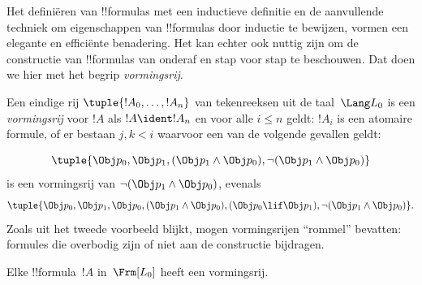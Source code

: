 \documentclass[../../../include/open-logic-section]{subfiles}
\begin{document}


Het definiëren van !!{formula}s met een inductieve definitie en de
aanvullende techniek om eigenschappen van !!{formula}s door inductie te
bewijzen, vormen een elegante en efficiënte benadering. Het kan echter
ook nuttig zijn om de constructie van !!{formula}s van onderaf en stap
voor stap te beschouwen. Dat doen we hier met het begrip
\emph{vormingsrij}.

\begin{defn}
Een eindige rij $\tuple{!A_0,\dotsc,!A_n}$ van tekenreeksen uit de
taal~$\Lang L_0$ is een \emph{vormingsrij} voor $!A$ als
$!A \ident !A_n$ en voor alle $i \leq n$ geldt: $!A_i$ is een
atomaire formule, of er bestaan $j,k < i$ waarvoor een van de volgende
gevallen geldt:
\begin{enumerate}
\end{enumerate}
\end{defn}

\begin{ex}
\[
\tuple{
    \Obj p_0,
    \Obj p_1,
    (\Obj p_1 \land \Obj p_0),
    \lnot (\Obj p_1 \land \Obj p_0)
}
\]
is een vormingsrij van
$\lnot (\Obj p_1 \land \Obj p_0)$, evenals
\[
\tuple{
    \Obj p_0,
    \Obj p_1,
    \Obj p_0,
    (\Obj p_1 \land \Obj p_0),
    (\Obj p_0 \lif \Obj p_1),
    \lnot (\Obj p_1 \land \Obj p_0)
}.
\]
%
Zoals uit het tweede voorbeeld blijkt, mogen vormingsrijen ``rommel''
bevatten: formules die overbodig zijn of niet aan de constructie
bijdragen.
\end{ex}

\begin{prop}
Elke !!{formula}~$!A$ in~$\Frm[L_0]$ heeft een vormingsrij.
\end{prop}
\end{document}
